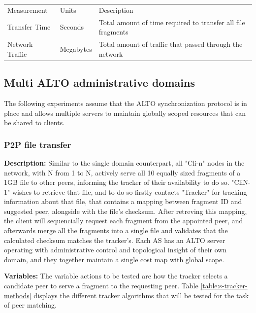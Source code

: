 \begin{table}[]
\begin{tabular}{lll}
Measurement     & Units     & Description                                                  \\
Transfer Time   & Seconds   & Total amount of time required to transfer all file fragments \\
Network Traffic & Megabytes & Total amount of traffic that passed through the network
\end{tabular}
\label{table:s1-measurements}
\end{table}

\subsection{Multi ALTO administrative domains}

    The following experiments assume that the ALTO synchronization protocol is in place and allows multiple servers to maintain globally scoped resources that can be shared to clients.

\subsubsection{P2P file transfer}

\textbf{Description:} Similar to the single domain counterpart, all "Cli-n" nodes in the network, with N from 1 to N, actively serve all 10 equally sized fragments of a 1GB file to other peers, informing the tracker of their availability to do so.
"CliN-1" wishes to retrieve that file, and to do so firstly contacts "Tracker" for tracking information about that file, that contains a mapping between fragment ID and suggested peer, alongside with the file's checksum.
    After retreving this mapping, the client will sequencially request each fragment from the appointed peer, and afterwards merge all the fragments into a single file and validates that the calculated checksum matches the tracker's.
    Each AS has an ALTO server operating with administrative control and topological insight of their own domain, and they together maintain a single cost map with global scope.

\textbf{Variables: } The variable actions to be tested are how the tracker selects a candidate peer to serve a fragment to the requesting peer.
Table \ref{table:s-tracker-methods} displays the different tracker algorithms that will be tested for the task of peer matching.

